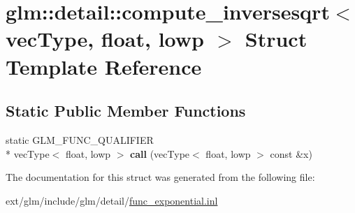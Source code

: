 \hypertarget{structglm_1_1detail_1_1compute__inversesqrt_3_01vec_type_00_01float_00_01lowp_01_4}{\section{glm\-:\-:detail\-:\-:compute\-\_\-inversesqrt$<$ vec\-Type, float, lowp $>$ Struct Template Reference}
\label{structglm_1_1detail_1_1compute__inversesqrt_3_01vec_type_00_01float_00_01lowp_01_4}
}
\subsection*{Static Public Member Functions}
\begin{DoxyCompactItemize}
\item 
\hypertarget{structglm_1_1detail_1_1compute__inversesqrt_3_01vec_type_00_01float_00_01lowp_01_4_a943fd9690f6c1fcb7383bfbcde30c3fb}{static G\-L\-M\-\_\-\-F\-U\-N\-C\-\_\-\-Q\-U\-A\-L\-I\-F\-I\-E\-R \\*
vec\-Type$<$ float, lowp $>$ {\bfseries call} (vec\-Type$<$ float, lowp $>$ const \&x)}\label{structglm_1_1detail_1_1compute__inversesqrt_3_01vec_type_00_01float_00_01lowp_01_4_a943fd9690f6c1fcb7383bfbcde30c3fb}

\end{DoxyCompactItemize}


The documentation for this struct was generated from the following file\-:\begin{DoxyCompactItemize}
\item 
ext/glm/include/glm/detail/\hyperlink{func__exponential_8inl}{func\-\_\-exponential.\-inl}\end{DoxyCompactItemize}
